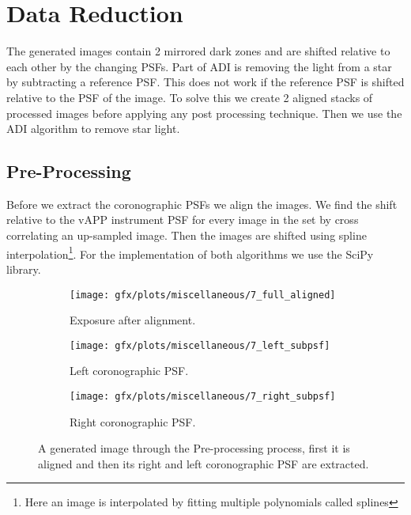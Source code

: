 
\chapter{Data Reduction} %
\label{ch:data_red} %
The generated images contain 2 mirrored dark zones and are shifted relative to each other by the changing \acp{PSF}. Part of \ac{ADI} is removing the light from a star by subtracting a reference \ac{PSF}. This does not work if the reference \ac{PSF} is shifted relative to the \ac{PSF} of the image. To solve this we create 2 aligned stacks of processed images before applying any post processing technique. Then we use the \ac{ADI} algorithm to remove star light.

\section{Pre-Processing}
Before we extract the coronographic \acp{PSF} we align the images. We find the shift relative to the \ac{vAPP} instrument \ac{PSF} for every image in the set by cross correlating an up-sampled image. Then the images are shifted using spline interpolation\footnote{Here an image is interpolated by fitting multiple polynomials called splines}. For the implementation of both algorithms we use the SciPy library\cite{scipy}.

\begin{figure}[h!]
  
      \begin{subfigure}[b]{0.5\textwidth}
        \texttt{[image: gfx/plots/miscellaneous/7\_full\_aligned]}
        \caption{Exposure after alignment.}
      \end{subfigure}%
      
      \begin{subfigure}[b]{0.5\textwidth}
        \texttt{[image: gfx/plots/miscellaneous/7\_left\_subpsf]}
        \caption{Left coronographic \ac{PSF}.}
        \label{fig:slice_a}
      \end{subfigure}      
      \begin{subfigure}[b]{0.5\textwidth}
        \texttt{[image: gfx/plots/miscellaneous/7\_right\_subpsf]}
        \caption{Right coronographic \ac{PSF}.}
        \label{fig:slice_b}
      \end{subfigure}%

  \caption{A generated image through the Pre-processing process, first it is aligned and then its right and left coronographic \ac{PSF} are extracted.}
  \label{fig:psfs_evolving}
\end{figure}

